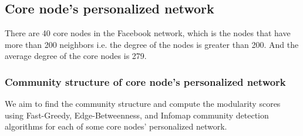 \documentclass[11pt]{article}
\begin{document}
\subsection{Core node’s personalized network}

There are 40 core nodes in the Facebook network, which is the nodes that have more than 200 neighbors i.e. the degree of the nodes is greater than 200. And the average degree of the core nodes is 279.
\subsubsection{Community structure of core node’s personalized network}

We aim to find the community structure and compute the modularity scores using Fast-Greedy, Edge-Betweenness, and Infomap community detection algorithms for each of some core nodes’ personalized network.
\end{document}
